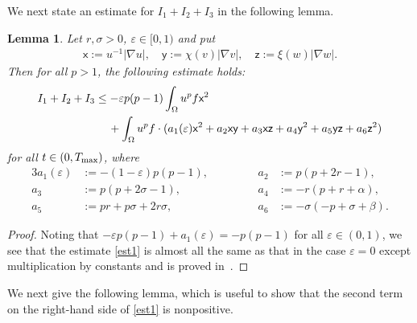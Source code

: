 \documentclass[12pt,reqno,draft]{article}
\numberwithin{equation}{section}
\theoremstyle{theorem}
\newtheorem{lem}[thm]{Lemma}
\theoremstyle{definition}
\newcommand{\ep}{\varepsilon}
\newcommand{\Tmax}{T_{\rm max}}
\begin{document}
We next state an estimate for $I_1+I_2+I_3$ in the following lemma. 
\begin{lem}
 Let $r, \sigma>0$, $\ep \in [0, 1)$ and put 
\begin{align*} 
\textsf{x} := u^{-1}|\nabla u|,\quad \textsf{y} := \chi(v)|\nabla v|,\quad
 \textsf{z} := \xi(w)|\nabla w|.
\end{align*} 
 Then for all $p>1$, the following estimate holds\/{\rm :}
    \begin{align}\label{est1}
               I_1+I_2+I_3
        &\le -\ep p(p-1) \int_\Omega u^pf\textsf{x}^2\notag\\
&\quad\,+\int_\Omega u^pf \cdot
            (a_1(\ep) \textsf{x}^2+a_2 \textsf{xy}+a_3 \textsf{xz}+a_4 \textsf{y}^2+a_5 \textsf{yz}+a_6 \textsf{z}^2)
    \end{align}
% 
 for all $t \in (0, \Tmax)$, where
%
    \begin{alignat*}{3}
        a_1(\ep) &:= -(1-\ep)p(p-1), & 
             &\qquad & 
        a_2 &:= p(p+2r-1),
    \\ 
        a_3 &:= p(p+2\sigma-1), &
             &\qquad & 
        a_4 &:= -r(p+r+\alpha),
    \\
        a_5 &:= pr+p\sigma+2r \sigma, &
             &\qquad &
        a_6 &:= -\sigma(-p+\sigma+\beta).
    \end{alignat*}
\end{lem}

\begin{proof}
Noting that $-\ep p(p-1)+a_1(\ep)=-p(p-1)$ 
for all $\ep \in (0,1)$, 
we see that the estimate \eqref{est1} is almost all the same as that in the case $\ep=0$ except multiplication by constants   
and is proved in~\cite[p.~10]{CMY-2020}. 
\end{proof}

We next give the following lemma, which is useful to show that the second term 
on the right-hand side of \eqref{est1} is nonpositive.
\end{document}
